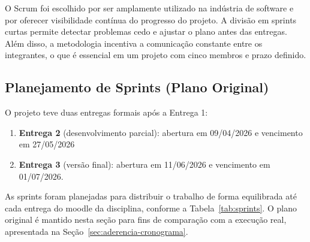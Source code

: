 \documentclass[12pt,a4paper]{article}
\begin{document}
O Scrum foi escolhido por ser amplamente utilizado na indústria de software e por oferecer
visibilidade contínua do progresso do projeto. A divisão em sprints curtas permite detectar
problemas cedo e ajustar o plano antes das entregas. Além disso, a metodologia incentiva
a comunicação constante entre os integrantes, o que é essencial em um projeto com cinco
membros e prazo definido.

\subsection{Planejamento de Sprints (Plano Original)}
\label{sec:planejamento-sprints}

O projeto teve duas entregas formais após a Entrega 1:
    \begin{enumerate}[leftmargin=*, label=\arabic*.]
        \item \textbf{Entrega 2} {(desenvolvimento parcial): abertura em 09/04/2026 e vencimento em 27/05/2026}
        \item \textbf{Entrega 3} {(versão final): abertura em 11/06/2026 e vencimento em 01/07/2026.}
    \end{enumerate}

As sprints foram planejadas para distribuir o trabalho de forma equilibrada até cada
entrega do moodle da disciplina, conforme a Tabela~\ref{tab:sprints}. O plano original é mantido
nesta seção para fins de comparação com a execução real, apresentada na
Seção~\ref{sec:aderencia-cronograma}.
\end{document}
